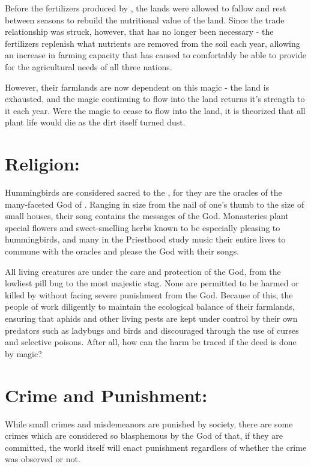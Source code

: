 \documentclass[blue]{GL2020}
\begin{document}
Before the fertilizers produced by \pTech{}, the lands were allowed to fallow and rest between seasons to rebuild the nutritional value of the land.  Since the trade relationship was struck, however, that has no longer been necessary - the fertilizers replenish what nutrients are removed from the soil each year, allowing an increase in farming capacity that has caused \pFarm{} to comfortably be able to provide for the agricultural needs of all three nations.

However, their farmlands are now dependent on this magic - the land is exhausted, and the magic continuing to flow into the land returns it's strength to it each year.  Were the magic to cease to flow into the land, it is theorized that all plant life would die as the dirt itself turned dust.
 
\section*{Religion:}

Hummingbirds are considered sacred to the \pFarmers{}, for they are the oracles of the many-faceted God of \pFarm{}.  Ranging in size from the nail of one's thumb to the size of small houses, their song contains the messages of the God.  Monasteries plant special flowers and sweet-smelling herbs known to be especially pleasing to hummingbirds, and many in the Priesthood study music their entire lives to commune with the oracles and please the God with their songs.

All living creatures are under the care and protection of the God, from the lowliest pill bug to the most majestic stag.  None are permitted to be harmed or killed by \pFarm{} without facing severe punishment from the God.  Because of this, the people of \pFarm{} work diligently to maintain the ecological balance of their farmlands, ensuring that aphids and other living pests are kept under control by their own predators such as ladybugs and birds and discouraged through the use of curses and selective poisons.  After all, how can the harm be traced if the deed is done by magic?  

\section*{Crime and Punishment:}

While small crimes and misdemeanors are punished by society, there are some crimes which are considered so blasphemous by the God of \pFarm{} that, if they are committed, the world itself will enact punishment regardless of whether the crime was observed or not.
\end{document}

